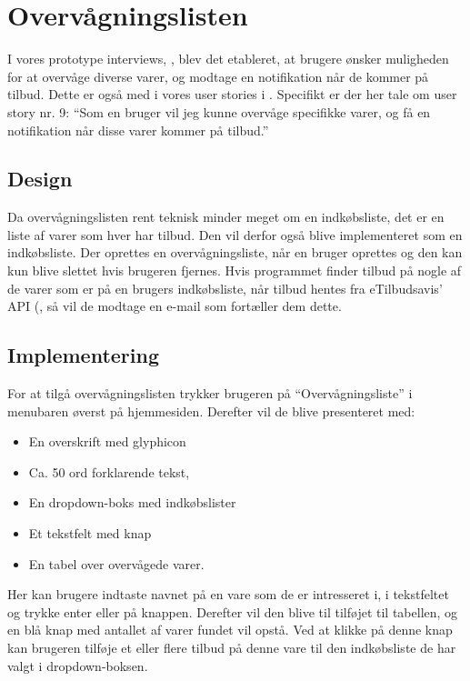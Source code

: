 \section{Overvågningslisten}
I vores prototype interviews, , blev det etableret, at brugere ønsker muligheden for at overvåge diverse varer, og modtage en notifikation når de kommer på tilbud.
Dette er også med i vores user stories i .
Specifikt er der her tale om user story nr. 9: ``Som en bruger vil jeg kunne overvåge specifikke varer, og få en notifikation når disse varer kommer på tilbud.''
\subsection{Design}
Da overvågningslisten rent teknisk minder meget om en indkøbsliste, det er en liste af varer som hver har tilbud.
Den vil derfor også blive implementeret som en indkøbsliste. 
Der oprettes en overvågningsliste, når en bruger oprettes og den kan kun blive slettet hvis brugeren fjernes.
Hvis programmet finder tilbud på nogle af de varer som er på en brugers indkøbsliste, når tilbud hentes fra eTilbudsavis' API (, så vil de modtage en e-mail som fortæller dem dette. 
\subsection{Implementering} 
For at tilgå overvågningslisten trykker brugeren på ``Overvågningsliste'' i menubaren øverst på hjemmesiden.
Derefter vil de blive presenteret med:
\begin{itemize} 
	\item En overskrift med glyphicon
	\item Ca. 50 ord forklarende tekst,
	\item En dropdown-boks med indkøbslister
	\item Et tekstfelt med knap
	\item En tabel over overvågede varer.
\end{itemize}
Her kan brugere indtaste navnet på en vare som de er intresseret i, i tekstfeltet og trykke enter eller på knappen.
Derefter vil den blive til tilføjet til tabellen, og en blå knap med antallet af varer fundet vil opstå.
Ved at klikke på denne knap kan brugeren tilføje et eller flere tilbud på denne vare til den indkøbsliste de har valgt i dropdown-boksen.

